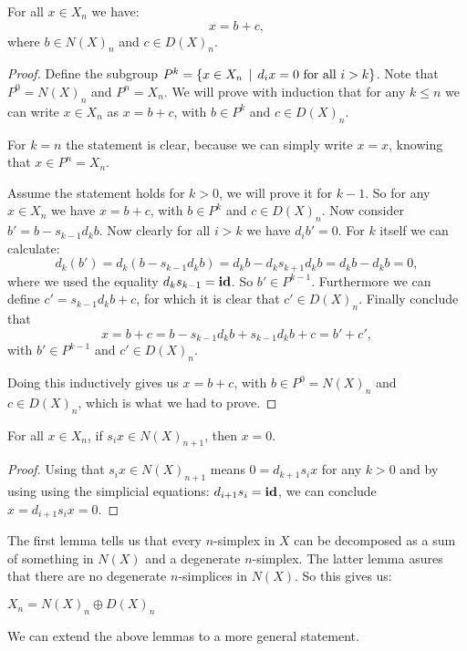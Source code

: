 \begin{lemma}
	\label{le:decomp1}
	For all $x \in X_n$ we have:
	$$ x = b + c,$$
	where $b \in N(X)_n$ and $c \in D(X)_n$.
\end{lemma}
\begin{proof}
	Define the subgroup $P^k = \{ x \in X_n \,\mid\, d_i x = 0 \text{ for all } i > k\}$. Note that $P^0 = N(X)_n$ and $P^n = X_n$. We will prove with induction that for any $k \leq n$ we can write $x \in X_n$ as $x = b + c$, with $b \in P^k$ and $c \in D(X)_n$.

	For $k = n$ the statement is clear, because we can simply write $x = x$, knowing that $x \in P^n = X_n$.

	Assume the statement holds for $k > 0$, we will prove it for $k-1$. So for any $x \in X_n$ we have $x = b + c$, with $b \in P^k$ and $c \in D(X)_n$. Now consider $b' = b - s_{k-1} d_k b$. Now clearly for all $i > k$ we have $d_i b' = 0$. For $k$ itself we can calculate:
	$$ d_k(b') = d_k(b - s_{k-1} d_k b) = d_k b - d_k s_{k+1} d_k b = d_k b - d_k b = 0, $$
	where we used the equality $d_k s_{k-1} = \mathbf{id}$. So $b' \in P^{k-1}$. Furthermore we can define $c' = s_{k-1} d_k b + c$, for which it is clear that $c' \in D(X)_n$. Finally conclude that
	$$ x = b + c = b - s_{k-1} d_k b + s_{k-1} d_k b + c = b' + c',$$
	with $b' \in P^{k-1}$ and $c' \in D(X)_n$.

	Doing this inductively gives us $x = b + c$, with $b \in P^0 = N(X)_n$ and $c \in D(X)_n$, which is what we had to prove.
\end{proof}
\begin{lemma}
	\label{le:decomp2}
	For all $x \in X_n$, if $s_i x \in N(X)_{n+1}$, then $x = 0$.
\end{lemma}
\begin{proof}
	Using that $s_i x \in N(X)_{n+1}$ means $0 = d_{k+1} s_i x$ for any $k > 0$ and by using using the simplicial equations: $d_{i+1} s_i = \mathbf{id}$, we can conclude $x = d_{i+1} s_i x = 0$.
\end{proof}

The first lemma tells us that every $n$-simplex in $X$ can be decomposed as a sum of something in $N(X)$ and a degenerate $n$-simplex. The latter lemma asures that there are no degenerate $n$-simplices in $N(X)$. So this gives us:

\begin{corollary}
	\label{cor:NandD}
	$X_n = N(X)_n \oplus D(X)_n$
\end{corollary}

We can extend the above lemmas to a more general statement.

